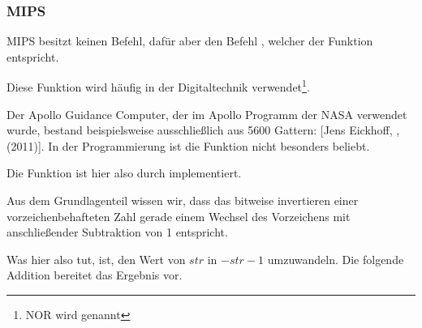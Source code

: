 \subsubsection{MIPS}




MIPS besitzt keinen \NOT Befehl, dafür aber den Befehl \NOT, welcher der
Funktion  entspricht.

Diese Funktion wird häufig in der Digitaltechnik verwendet\footnote{NOR wird
  genannt}.

Der Apollo Guidance Computer, der im Apollo Programm der NASA verwendet wurde,
bestand beispielsweise ausschließlich aus 5600 \NOR Gattern:
[Jens Eickhoff, , (2011)].
In der Programmierung ist die Funktion \NOT nicht besonders beliebt. 

Die \NOT Funktion ist hier also durch  implementiert.

Aus dem Grundlagenteil  wissen wir, dass das bitweise
invertieren einer vorzeichenbehafteten Zahl gerade einem Wechsel des Vorzeichens
mit anschließender Subtraktion von 1 entspricht. 

Was \NOT hier also tut, ist, den Wert von $str$ in $-str-1$ umzuwandeln. 
Die folgende Addition bereitet das Ergebnis vor.
